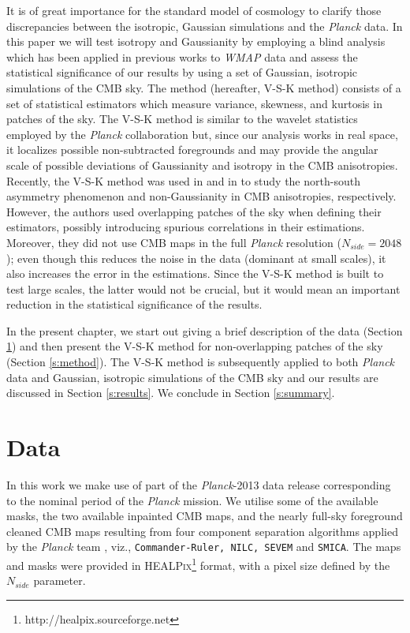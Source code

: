 It is of great importance for the standard model of cosmology to clarify those discrepancies between the isotropic, Gaussian simulations and the \textit{Planck} data. In this paper we will test isotropy and Gaussianity by employing a blind analysis which has been applied in previous works to \textit{WMAP} data and assess the statistical significance of our results by using a set of Gaussian, isotropic simulations of the CMB sky. The method (hereafter, V-S-K method) consists of a set of statistical estimators which measure variance, skewness, and kurtosis in patches of the sky. The V-S-K method is similar to the wavelet statistics employed by the \textit{Planck} collaboration but, since our analysis works in real space, it localizes possible non-subtracted foregrounds and may provide the angular scale of possible deviations of Gaussianity and isotropy in the CMB anisotropies. Recently, the V-S-K method was used in \cite{Bernui2014} and in \cite{Bernui2014a} to study the north-south asymmetry phenomenon and non-Gaussianity in CMB anisotropies, respectively. However, the authors used overlapping patches of the sky when defining their estimators, possibly introducing spurious correlations in their estimations. Moreover, they did not use CMB maps in the full \textit{Planck} resolution ($N_{side}=2048$); even though this reduces the noise in the data (dominant at small scales), it also increases the error in the estimations. Since the V-S-K method is built to test large scales, the latter would not be crucial, but it would mean an important reduction in the statistical significance of the results.

In the present chapter, we start out giving a brief description of the data (Section \ref{s:data}) and then present the V-S-K method for non-overlapping patches of the sky (Section \ref{s:method}). The V-S-K method is subsequently applied to both \textit{Planck} data and Gaussian, isotropic simulations of the CMB sky and our results are discussed in Section \ref{s:results}. We conclude in Section \ref{s:summary}.

\section{Data}
\label{s:data}

In this work we make use of part of the \textit{Planck}-2013 data release corresponding to the nominal period of the \textit{Planck} mission. We utilise some of the available masks, the two available inpainted CMB maps, and the nearly full-sky foreground cleaned CMB maps resulting from four  component separation algorithms applied by the \textit{Planck} team \cite{Ade2014d}, viz., \texttt{Commander-Ruler, NILC, SEVEM} and \texttt{SMICA}. The maps and masks were provided in \textsc{HEALPix}\footnote{http://healpix.sourceforge.net} format, with a pixel size defined by the $N_{side}$ parameter. 

